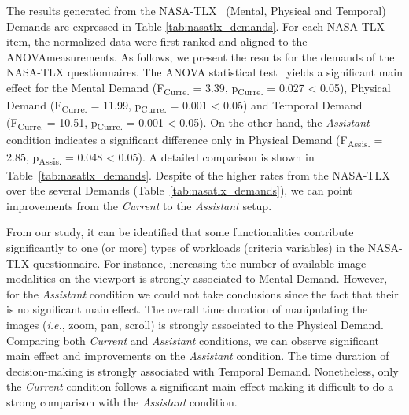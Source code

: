 The results generated from the NASA-TLX~\cite{grier2015high, ramkumar2017using} (Mental, Physical and Temporal) Demands are expressed in Table \ref{tab:nasatlx_demands}.
For each NASA-TLX item, the normalized data were first ranked and aligned to the ANOVA\footnotemark[12] measurements.
As follows, we present the results for the demands of the NASA-TLX questionnaires.
The ANOVA statistical test~\cite{Wobbrock:2011:ART:1978942.1978963, mathews2017usability} yields a significant main effect for the Mental Demand (F\textsubscript{Curre.} = 3.39, p\textsubscript{Curre.} = 0.027 < 0.05), Physical Demand (F\textsubscript{Curre.} = 11.99, p\textsubscript{Curre.} = 0.001 < 0.05) and Temporal Demand (F\textsubscript{Curre.} = 10.51, p\textsubscript{Curre.} = 0.001 < 0.05).
On the other hand, the {\it Assistant} condition indicates a significant difference only in Physical Demand (F\textsubscript{Assis.} = 2.85, p\textsubscript{Assis.} = 0.048 < 0.05). A detailed comparison is shown in Table~\ref{tab:nasatlx_demands}.
Despite of the higher rates from the NASA-TLX over the several Demands (Table~\ref{tab:nasatlx_demands}), we can point improvements from the {\it Current} to the {\it Assistant} setup.

From our study, it can be identified that some functionalities contribute significantly to one (or more) types of workloads (criteria variables) in the NASA-TLX questionnaire.
For instance, increasing the number of available image modalities on the viewport is strongly associated to Mental Demand.
However, for the {\it Assistant} condition we could not take conclusions since the fact that their is no significant main effect.
The overall time duration of manipulating the images ({\it i.e.}, zoom, pan, scroll) is strongly associated to the Physical Demand.
Comparing both {\it Current} and {\it Assistant} conditions, we can observe significant main effect and improvements on the {\it Assistant} condition.
The time duration of decision-making is strongly associated with Temporal Demand.
Nonetheless, only the {\it Current} condition follows a significant main effect making it difficult to do a strong comparison with the {\it Assistant} condition.


